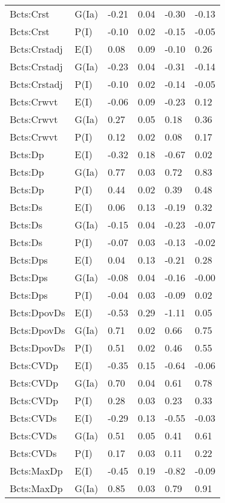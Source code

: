 \begin{center}
\begin{longtable}{|p{1.1in}|p{0.7in}|p{0.7in}|p{0.6in}|p{0.6in}|p{0.6in}|}
  Bcts:Crst & G(Ia) & -0.21 & 0.04 & -0.30 & -0.13 \\ 
  Bcts:Crst & P(I) & -0.10 & 0.02 & -0.15 & -0.05 \\ 
  Bcts:Crstadj & E(I) & 0.08 & 0.09 & -0.10 & 0.26 \\ 
  Bcts:Crstadj & G(Ia) & -0.23 & 0.04 & -0.31 & -0.14 \\ 
  Bcts:Crstadj & P(I) & -0.10 & 0.02 & -0.14 & -0.05 \\ 
  Bcts:Crwvt & E(I) & -0.06 & 0.09 & -0.23 & 0.12 \\ 
  Bcts:Crwvt & G(Ia) & 0.27 & 0.05 & 0.18 & 0.36 \\ 
  Bcts:Crwvt & P(I) & 0.12 & 0.02 & 0.08 & 0.17 \\ 
  Bcts:Dp & E(I) & -0.32 & 0.18 & -0.67 & 0.02 \\ 
  Bcts:Dp & G(Ia) & 0.77 & 0.03 & 0.72 & 0.83 \\ 
  Bcts:Dp & P(I) & 0.44 & 0.02 & 0.39 & 0.48 \\ 
  Bcts:Ds & E(I) & 0.06 & 0.13 & -0.19 & 0.32 \\ 
  Bcts:Ds & G(Ia) & -0.15 & 0.04 & -0.23 & -0.07 \\ 
  Bcts:Ds & P(I) & -0.07 & 0.03 & -0.13 & -0.02 \\ 
  Bcts:Dps & E(I) & 0.04 & 0.13 & -0.21 & 0.28 \\ 
  Bcts:Dps & G(Ia) & -0.08 & 0.04 & -0.16 & -0.00 \\ 
  Bcts:Dps & P(I) & -0.04 & 0.03 & -0.09 & 0.02 \\ 
  Bcts:DpovDs & E(I) & -0.53 & 0.29 & -1.11 & 0.05 \\ 
  Bcts:DpovDs & G(Ia) & 0.71 & 0.02 & 0.66 & 0.75 \\ 
  Bcts:DpovDs & P(I) & 0.51 & 0.02 & 0.46 & 0.55 \\ 
  Bcts:CVDp & E(I) & -0.35 & 0.15 & -0.64 & -0.06 \\ 
  Bcts:CVDp & G(Ia) & 0.70 & 0.04 & 0.61 & 0.78 \\ 
  Bcts:CVDp & P(I) & 0.28 & 0.03 & 0.23 & 0.33 \\ 
  Bcts:CVDs & E(I) & -0.29 & 0.13 & -0.55 & -0.03 \\ 
  Bcts:CVDs & G(Ia) & 0.51 & 0.05 & 0.41 & 0.61 \\ 
  Bcts:CVDs & P(I) & 0.17 & 0.03 & 0.11 & 0.22 \\ 
  Bcts:MaxDp & E(I) & -0.45 & 0.19 & -0.82 & -0.09 \\ 
  Bcts:MaxDp & G(Ia) & 0.85 & 0.03 & 0.79 & 0.91 \\ 

\end{longtable}
\end{center}
